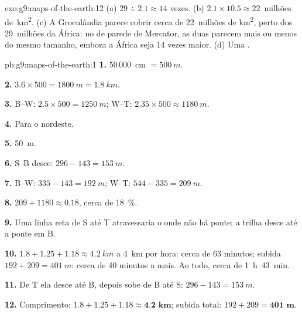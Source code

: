 \begin{solution}{exo:g9:maps-of-the-earth:12}
(a) $29 \div 2.1 \approx 14$ vezes. (b) $2.1 \times 10.5 \approx
22$~milhões de~\unit{km^2}. (c) A Groenlândia parece cobrir cerca de
22~milhões de \unit{km^2}, perto dos 29~milhões da África: no  de
parede de Mercator, as duas parecem mais ou menos do mesmo tamanho,
embora a África seja 14 vezes maior. (d) Uma .
\end{solution}

\begin{solution}{pb:g9:maps-of-the-earth:1}
\textbf{1.} $50\,000$~cm $= \qty{500}{m}$.

\textbf{2.} $3.6 \times 500 = \qty{1800}{m} = \qty{1.8}{km}$.

\textbf{3.} B--W: $2.5 \times 500 = \qty{1250}{m}$; W--T: $2.35 \times 500
\approx \qty{1180}{m}$.

\textbf{4.} Para o nordeste.

\textbf{5.} \qty{50}{m}.

\textbf{6.} S--B desce: $296 - 143 = \qty{153}{m}$.

\textbf{7.} B--W: $335 - 143 = \qty{192}{m}$; W--T: $544 - 335 =
\qty{209}{m}$.

\textbf{8.} $209 \div 1180 \approx 0.18$, cerca de \qty{18}{\%}.

\textbf{9.} Uma linha reta de S até T atravessaria o  onde não há
ponte; a trilha desce até a ponte em B.

\textbf{10.} $1.8 + 1.25 + 1.18 \approx \qty{4.2}{km}$ a \qty{4}{km} por
hora: cerca de 63 minutos; subida $192 + 209 = \qty{401}{m}$: cerca de 40
minutos a mais. Ao todo, cerca de 1~h~43~min.

\textbf{11.} De T ela desce até B, depois sobe de B até S: $296 -
143 = \qty{153}{m}$.

\textbf{12.} Comprimento: $1.8 + 1.25 + 1.18 \approx \textbf{4.2 km}$;
subida total: $192 + 209 = \textbf{401 m}$.
\end{solution}
